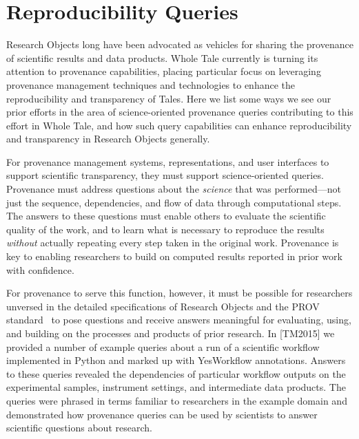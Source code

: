 \section{Reproducibility Queries}\label{sec-transparency}

Research Objects long have been advocated as vehicles for sharing the 
	provenance of scientific results and data products.
Whole Tale currently is turning its attention to provenance capabilities, placing particular
	focus on leveraging provenance management techniques and technologies
	to enhance the reproducibility and transparency of Tales.
Here we list some ways we see our prior efforts in the area
	of science-oriented provenance queries contributing to this effort in Whole Tale,
	and how such query capabilities can enhance reproducibility and transparency in 
	Research Objects generally.

For provenance management systems, representations, and user interfaces to support 
	scientific transparency, they must support science-oriented queries.
Provenance must address questions about the \emph{science} that was performed---not just the
	sequence, dependencies, and flow of data through computational steps.
The answers to these questions must enable others to evaluate the scientific quality of the work, 
	and to learn what is necessary to
	reproduce the results \emph{without} actually repeating every step taken in the original work.
Provenance is key to enabling researchers to build on computed results reported in prior work with confidence.

For provenance to serve this function, however, it must be possible for researchers unversed in the detailed
	specifications of Research Objects and the PROV standard~\cite{groth2013provoverviewa} to pose 
	questions and receive answers meaningful for evaluating, using, and building on the
	processes and products of prior research. 
In [TM2015] we provided a number of example queries about a run of a scientific
	workflow implemented in Python and marked up with YesWorkflow annotations.
Answers to these queries revealed the dependencies of particular workflow outputs
	on the experimental samples, instrument settings, and intermediate data products.
The queries were phrased in terms familiar to researchers  in the example domain
	and demonstrated how provenance queries can be used by scientists
	to answer scientific questions about research.

